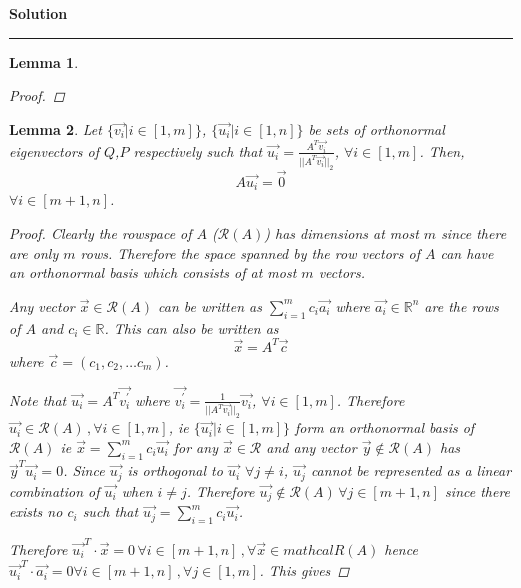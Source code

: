 \documentclass[a4paper,12pt]{article}
\newenvironment{solution}[2][]{%
    \begin{mdframed}[linecolor=blue!70!black, linewidth=2pt, roundcorner=10pt, backgroundcolor=yellow!10!white, skipabove=12pt, skipbelow=12pt]%
        \textbf{\large #2}
        \par\noindent\rule{\textwidth}{0.4pt}
}{
    \end{mdframed}
}
\newtheorem{lemma}{Lemma}
\begin{document}
\begin{solution}{Solution}
\begin{lemma}
\begin{proof}
          \end{proof}
        \end{lemma}
        \begin{lemma}\label{l4}
          Let $\{\vec{v_{i}} | i \in [1,m]\}$, $\{\vec{u_{i}} | i \in [1,n]\}$ be sets of orthonormal eigenvectors of $Q$,$P$ respectively 
          such that $\vec{u_{i}} = \frac{A^{T}\vec{v_{i}}}{\lvert\lvert A^{T}\vec{v_{i}}\rvert\rvert_{2}}$,
          $ \forall i \in [1,m]$. Then,
          \[ A \vec{u_{i}} = \vec{0}\]
          $\forall i \in [m + 1,n]$.
          \begin{proof}
              Clearly the rowspace of $A$ ($\mathcal{R}(A)$) has dimensions at most $m$ since there are only $m$ rows. Therefore the space spanned
              by the row vectors of $A$ can have an orthonormal basis which consists of at most $m$ vectors. 

              Any vector $\vec{x} \in \mathcal{R}(A)$ can be written as $\sum\limits_{i = 1}^{m} c_{i} \vec{a_{i}}$ where 
              $\vec{a_{i}} \in \mathbb{R}^{n}$ are the rows of $A$ and $c_{i} \in \mathbb{R}$. This can also be written as 
              \[\vec{x} = A^{T} \vec{c}\]
              where $\vec{c} = (c_{1},c_{2},\dots c_{m})$. 

              Note that $\vec{u_{i}} = A^{T}\vec{v_{i}^{'}}$ where 
              $\vec{v_{i}^{'}} = \frac{1}{\lvert\lvert A^{T}\vec{v_{i}}\rvert\rvert_{2}}\vec{v_{i}}$, $\forall i \in [1,m]$. Therefore 
              $\vec{u_{i}} \in \mathcal{R}(A) \, , \forall i \in [1,m]$, ie $\{\vec{u_{i}} | i \in [1,m]\}$ form an 
              orthonormal basis of 
              $\mathcal{R}(A)$ ie $\vec{x} = \sum\limits_{i = 1}^{m} c_{i} \vec{u_{i}}$ for any $\vec{x} \in \mathcal{R}$ and 
              any vector $\vec{y} \notin \mathcal{R}(A)$ has $\vec{y}^{T} \vec{u_{i}} = 0$. Since 
              $\vec{u_{j}}$ is orthogonal to $\vec{u_{i}}$ $\forall j \neq i$, $\vec{u_{j}}$ cannot be represented as a linear
              combination of $\vec{u_{i}}$ when $i \neq j$. Therefore $\vec{u_{j}} \notin \mathcal{R}(A) \, \forall j \in [m + 1,n]$
              since there exists no $c_{i}$ such that $\vec{u_{j}} = \sum\limits_{i = 1}^{m} c_{i} \vec{u_{i}}$.
              
              Therefore $\vec{u_{i}}^{T}\cdot\vec{x} = 0 \, \forall i \in [m + 1,n]\, , \forall \vec{x} \in mathcal{R}(A)$ hence 
              $\vec{u_{i}}^{T} \cdot \vec{a_{i}} = 0 \forall i \in [m + 1,n]\, , \forall j \in [1,m]$. This gives 
              

\end{proof}
\end{lemma}
\end{solution}
\end{document}
